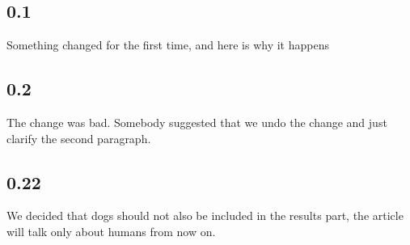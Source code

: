\documentclass[10pt, a4paper, onecolumn]{article} %
\begin{document}
\subsection*{0.1}

Something changed for the first time, and here is why it happens

\subsection*{0.2}

The change was bad. Somebody suggested that we undo the change and just clarify the second paragraph.

\subsection*{0.22}

We decided that dogs should not also be included in the results part, the article will talk only about humans from now on.
\end{document}
